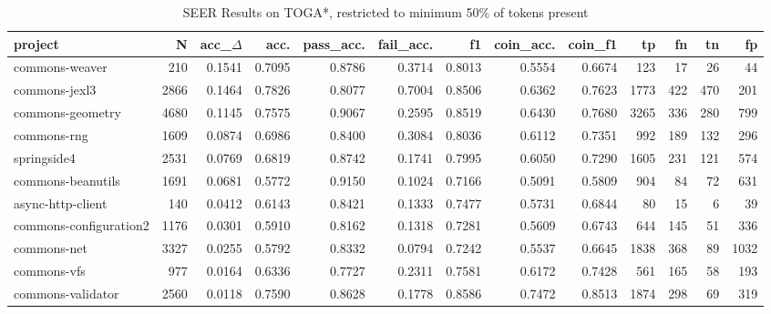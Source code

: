 \begin{table*}
\centering
\caption{SEER Results on TOGA*, restricted to minimum 50\% of tokens present}
\label{tab:toga_results_50}
\begin{tabular}{lrrrrrrrrrrrr}
\toprule
                project &       N &  acc\_$\Delta$ &    acc. &  pass\_acc. &  fail\_acc. &      f1 &  coin\_acc. &  coin\_f1 &     tp &     fn &    tn &     fp \\
\midrule
         commons-weaver &     210 &      0.1541 &  0.7095 &     0.8786 &     0.3714 &  0.8013 &     0.5554 &   0.6674 &    123 &     17 &    26 &     44 \\
          commons-jexl3 &    2866 &      0.1464 &  0.7826 &     0.8077 &     0.7004 &  0.8506 &     0.6362 &   0.7623 &   1773 &    422 &   470 &    201 \\
       commons-geometry &    4680 &      0.1145 &  0.7575 &     0.9067 &     0.2595 &  0.8519 &     0.6430 &   0.7680 &   3265 &    336 &   280 &    799 \\
            commons-rng &    1609 &      0.0874 &  0.6986 &     0.8400 &     0.3084 &  0.8036 &     0.6112 &   0.7351 &    992 &    189 &   132 &    296 \\
            springside4 &    2531 &      0.0769 &  0.6819 &     0.8742 &     0.1741 &  0.7995 &     0.6050 &   0.7290 &   1605 &    231 &   121 &    574 \\
      commons-beanutils &    1691 &      0.0681 &  0.5772 &     0.9150 &     0.1024 &  0.7166 &     0.5091 &   0.5809 &    904 &     84 &    72 &    631 \\
      async-http-client &     140 &      0.0412 &  0.6143 &     0.8421 &     0.1333 &  0.7477 &     0.5731 &   0.6844 &     80 &     15 &     6 &     39 \\
 commons-configuration2 &    1176 &      0.0301 &  0.5910 &     0.8162 &     0.1318 &  0.7281 &     0.5609 &   0.6743 &    644 &    145 &    51 &    336 \\
            commons-net &    3327 &      0.0255 &  0.5792 &     0.8332 &     0.0794 &  0.7242 &     0.5537 &   0.6645 &   1838 &    368 &    89 &   1032 \\
            commons-vfs &     977 &      0.0164 &  0.6336 &     0.7727 &     0.2311 &  0.7581 &     0.6172 &   0.7428 &    561 &    165 &    58 &    193 \\
      commons-validator &    2560 &      0.0118 &  0.7590 &     0.8628 &     0.1778 &  0.8586 &     0.7472 &   0.8513 &   1874 &    298 &    69 &    319 \\

\end{tabular}
\end{table*}
